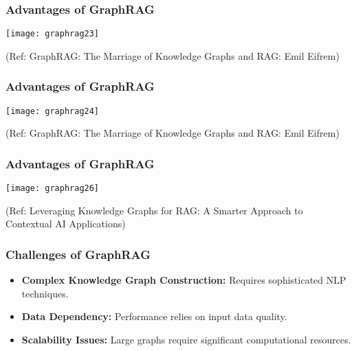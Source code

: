 \begin{frame}[fragile]\frametitle{Advantages of GraphRAG}

	\begin{center}
	\texttt{[image: graphrag23]}
	\end{center}
	
	{\tiny (Ref: GraphRAG: The Marriage of Knowledge Graphs and RAG: Emil Eifrem)}

	
\end{frame}

\begin{frame}[fragile]\frametitle{Advantages of GraphRAG}

	\begin{center}
	\texttt{[image: graphrag24]}
	\end{center}
	
	{\tiny (Ref: GraphRAG: The Marriage of Knowledge Graphs and RAG: Emil Eifrem)}

	
\end{frame}

\begin{frame}[fragile]\frametitle{Advantages of GraphRAG}

	\begin{center}
	\texttt{[image: graphrag26]}
	\end{center}
	
	{\tiny (Ref: Leveraging Knowledge Graphs for RAG: A Smarter Approach to Contextual AI Applications)}

	
\end{frame}


\begin{frame}[fragile]\frametitle{Challenges of GraphRAG}
    \begin{itemize}
        \item \textbf{Complex Knowledge Graph Construction:} Requires sophisticated NLP techniques.
        \item \textbf{Data Dependency:} Performance relies on input data quality.
        \item \textbf{Scalability Issues:} Large graphs require significant computational resources.
    \end{itemize}
\end{frame}

